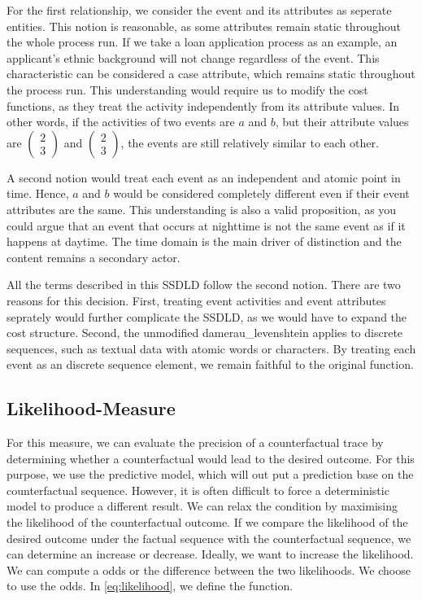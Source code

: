 \documentclass[./../../paper.tex]{subfiles}
\begin{document}
For the first relationship, we consider the event and its attributes as seperate entities. This notion is reasonable, as some attributes remain static throughout the whole process run. If we take a loan application process as an example, an applicant's ethnic background will not change regardless of the event. This characteristic can be considered a case attribute, which remains static throughout the process run. This understanding would require us to modify the cost functions, as they treat the activity independently from its attribute values. In other words, if the activities of two events are $a$ and $b$, but their attribute values are $\left(\begin{smallmatrix}2 \\ 3\end{smallmatrix}\right)$ and $\left(\begin{smallmatrix}2 \\ 3\end{smallmatrix}\right)$, the events are still relatively similar to each other. 

A second notion would treat each event as an independent and atomic point in time. Hence, $a$ and $b$ would be considered completely different even if their event attributes are the same. This understanding is also a valid proposition, as you could argue that an event that occurs at nighttime is not the same event as if it happens at daytime. The time domain is the main driver of distinction and the content remains a secondary actor. 

All the terms described in this \gls{SSDLD} follow the second notion. There are two reasons for this decision. First, treating event activities and event attributes seprately would further complicate the \gls{SSDLD}, as we would have to expand the cost structure. Second, the unmodified \gls{damerau_levenshtein} applies to discrete sequences, such as textual data with atomic words or characters. By treating each event as an discrete sequence element, we remain faithful to the original function.

\subsection{Likelihood-Measure}
For this measure, we can evaluate the precision of a counterfactual trace by determining whether a counterfactual would lead to the desired outcome. For this purpose, we use the predictive model, which will out put a prediction base on the counterfactual sequence. However, it is often difficult to force a deterministic model to produce a different result. We can relax the condition by maximising the likelihood of the counterfactual outcome. If we compare the likelihood of the desired outcome under the factual sequence with the counterfactual sequence, we can determine an increase or decrease. Ideally, we want to increase the likelihood. We can compute a odds or the difference between the two likelihoods. We choose to use the odds. In \autoref{eq:likelihood}, we define the function.
\end{document}
